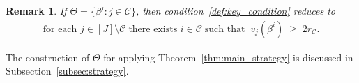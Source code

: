 \documentclass[aap,preprint]{imsart}
\newcommand{\Pro}{{\mathbb{P}}}
\theoremstyle{plain}
\newtheorem{remark}{Remark}[section]
\theoremstyle{definition}
\begin{document}

\begin{remark} \label{remark:key_condition_special}
If $\Theta = \{\beta^j : j \in \mathcal{C}\}$, then condition~\eqref{def:key_condition} reduces to
\begin{align*}%
\text{for each } j \in [J] \setminus \mathcal{C}  \; \text{there exists } i \in \mathcal{C} \; \text{such that} \;\;
v_j(\beta^i) \;\geq\; 2 r_\mathcal{C}.
\end{align*}
\end{remark}

The construction of $\Theta$ for applying Theorem~\ref{thm:main_strategy} is discussed in Subsection~\ref{subsec:strategy}.

 



 
\end{document}
